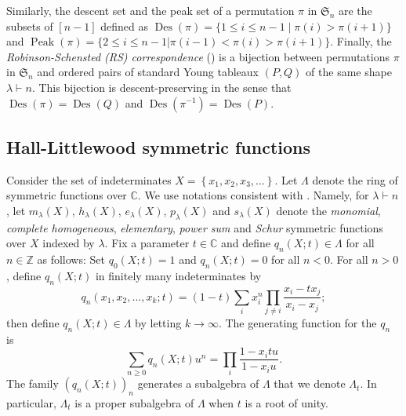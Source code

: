 \documentclass[revision]{FPSAC2024}
\newcommand{\al}{\alpha}
\newcommand{\la}{\lambda}
\newcommand{\CC}{\mathbb{C}} %
\newcommand{\ZZ}{\mathbb{Z}} %
\newcommand{\Des}{\operatorname{Des}}
\newcommand{\Peak}{\operatorname{Peak}}
\begin{document}
Similarly, the descent set and the peak set of a permutation $\pi$ in $\mathfrak{S}_n$ are the subsets of $[n-1]$ defined as $\Des(\pi) = \{1\leq i \leq n-1\mid \pi(i)>\pi(i+1)\}$ and $\Peak(\pi) = \{2\leq i\leq n-1| \pi(i-1)<\pi(i)>\pi(i+1)\}$.
Finally, the {\it Robinson-Schensted (RS) correspondence} (\cite{Sch61, Sta01}) is a bijection between permutations $\pi$ in $\mathfrak{S}_n$ and ordered pairs of standard Young tableaux $(P,Q)$ of the same shape $\la \vdash n$. This bijection is descent-preserving in the sense that $\Des(\pi) = \Des(Q)$ and $\Des(\pi^{-1}) = \Des(P)$.
\subsection{Hall-Littlewood symmetric functions}
Consider the set of indeterminates $X = \left\{x_1,x_2,x_3,\ldots\right\}$. Let $\Lambda$ denote the ring of symmetric functions over
$\CC$. We use notations consistent with \cite{Mac99}. Namely, for $\la \vdash n$, let $m_{\lambda}(X)$, $h_{\la}(X)$, $e_{\la}(X)$, $p_{\la}(X)$ and $s_{\lambda}(X)$ denote the \emph{monomial}, \emph{complete homogeneous}, \emph{elementary}, \emph{power sum} and \emph{Schur} symmetric functions over $X$ indexed by $\la$. Fix a parameter $t \in \CC$ and define $q_n(X;t) \in \Lambda$ for all $n \in \ZZ$ as follows: Set $q_0(X;t) = 1$ and $q_n(X;t) = 0$ for all $n < 0$. For all $n > 0$, define $q_n(X; t)$ in finitely many indeterminates by
\begin{equation}
q_n(x_1, x_2, \ldots, x_k ;t) = \left(1-t \right)\sum_{i}x_i^n\prod_{j \neq i}\frac{x_i - tx_j}{x_i - x_j} ;
\end{equation}
then define $q_n(X; t) \in \Lambda$ by letting $k \to \infty$.
The generating function for the $q_n$ is
\begin{equation}
\sum_{n \geq 0}q_n(X;t)u^n = \prod_{i}\frac{1 - x_itu}{1 - x_iu}.
\label{eq : genfun-qn}
\end{equation}
The family $(q_n(X;t))_n$ generates a subalgebra of $\Lambda$ that we denote $\Lambda_t$. In particular, $\Lambda_t$ is a proper subalgebra of $\Lambda$ when $t$ is a root of unity. 
\end{document}
